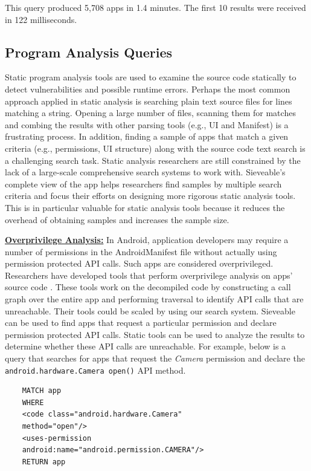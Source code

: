 This query produced 5,708 apps in 1.4 minutes. The first 10 results were received in 122 milliseconds.
\subsection{Program Analysis Queries}
Static program analysis tools are used to examine the source code statically to detect vulnerabilities and possible runtime errors.
Perhaps the most common approach applied in static analysis is searching plain text source files for lines matching a string.
Opening a large number of files, scanning them for matches and combing the results with other parsing tools (e.g., UI and Manifest) is a frustrating process. 
In addition, finding a sample of apps that match a given criteria (e.g., permissions, UI structure) along with the source code text search is a challenging search task.
Static analysis researchers are still constrained by the lack of a large-scale comprehensive search systems to work with.
Sieveable's complete view of the app helps researchers find samples by multiple search criteria and focus their efforts on designing more rigorous static analysis tools.
This is in particular valuable for static analysis tools because it reduces the overhead of obtaining samples and increases the sample size.

\underline{\textbf{Overprivilege Analysis:}}
In Android, application developers may require a number of permissions in the AndroidManifest file without actually using permission protected API calls. Such apps are considered overprivileged. 
Researchers have developed tools that perform overprivilege analysis on apps' source code \cite{felt2011android,au2012pscout}.
These tools work on the decompiled code by constructing a call graph over the entire app and performing traversal to identify API calls that are unreachable.
Their tools could be scaled by using our search system. 
Sieveable can be used to find apps that request a particular permission and declare permission protected API calls.
Static tools can be used to analyze the results to determine whether these API calls are unreachable.
For example, below is a query that searches for apps that request the \textit{Camera} permission and declare the \texttt{android.hardware.Camera open()} API method.

\begin{verbatim}
	MATCH app
	WHERE
	<code class="android.hardware.Camera"
	method="open"/>
	<uses-permission 
	android:name="android.permission.CAMERA"/>
	RETURN app
\end{verbatim}

